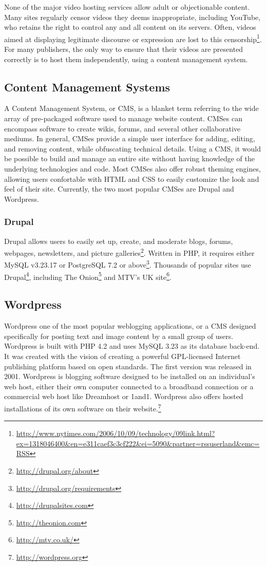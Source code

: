 \documentclass[a4paper,12pt]{report}
\begin{document}
None of the major video hosting services allow adult or objectionable content.
Many sites regularly censor videos they deems inappropriate, including YouTube, who retains the right to control any and all content on its servers.
Often, videos aimed at displaying legitimate discourse or expression are lost to this censorship\footnote{\url{http://www.nytimes.com/2006/10/09/technology/09link.html?ex=1318046400&en=e311caef3c3cf222&ei=5090&partner=rssuserland&emc=RSS}}.
For many publishers, the only way to ensure that their videos are presented correctly is to host them independently, using a content management system.

\subsection{Content Management Systems}

A Content Management System, or CMS, is a blanket term referring to the wide array of pre-packaged software used to manage website content. CMSes can encompass software to create wikis, forums, and several other collaborative mediums. In general, CMSes provide a simple user interface for adding, editing, and removing content, while obfuscating technical details. Using a CMS, it would be possible to build and manage an entire site without having knowledge of the underlying technologies and code. Most CMSes also offer robust theming engines, allowing users confortable with HTML and CSS to easily customize the look and feel of their site. Currently, the two most popular CMSes are Drupal and Wordpress.

\subsubsection{Drupal}
Drupal allows users to easily set up, create, and moderate blogs, forums, webpages, newsletters, and picture galleries\footnote{\url{http://drupal.org/about}}.
Written in PHP, it requires either MySQL v3.23.17 or PostgreSQL 7.2 or above\footnote{\url{http://drupal.org/requirements}}.
Thousands of popular sites use Drupal\footnote{\url{http://drupalsites.com}}, including The Onion\footnote{\url{http://theonion.com}} and MTV's UK site\footnote{\url{http://mtv.co.uk/}}.

\subsection{Wordpress}
Wordpress one of the most popular weblogging applications, or a CMS designed specifically for posting text and image content by a small group of users.
Wordpress is built with PHP 4.2 and uses MySQL 3.23 as its database back-end. 
It was created with the vision of creating a powerful GPL-licensed Internet publishing platform based on open standards. 
The first version was released in 2001. 
Wordpress is blogging software designed to be installed on an individual's web host, either their own computer connected to a broadband connection or a commercial web host like Dreamhost or 1and1. Wordpress also offers hosted installations of its own software on their website.\footnote{\url{http://wordpress.org}}
\end{document}
